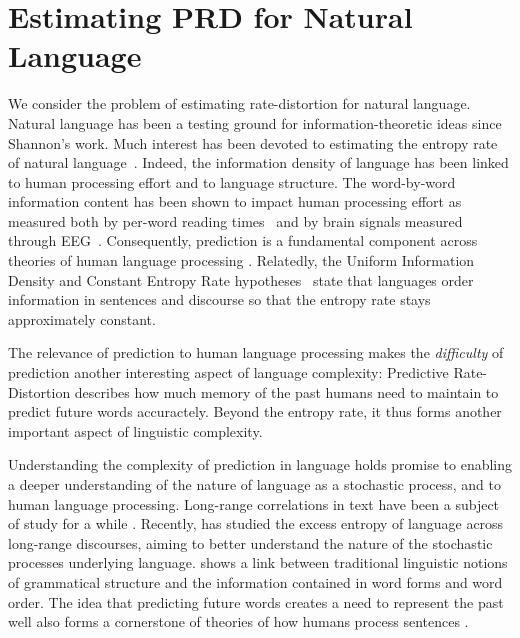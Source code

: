 \documentclass[entropy,article,submit,moreauthors,pdftex,10pt,a4paper]{Definitions/mdpi}
\begin{document}
\section{Estimating PRD for Natural Language}\label{sec:language}

We consider the problem of estimating rate-distortion for natural language.
Natural language has been a testing ground for information-theoretic ideas since Shannon's work.
Much interest has been devoted to estimating the entropy rate of natural language~\citep{shannon1951prediction,takahira2016entropy,bentz2017entropy,takahashi2018cross}.
Indeed, the information density of language has been linked to human processing effort and to language structure.
The word-by-word information content has been shown to impact human processing effort as measured both by per-word reading times~\citep{hale-probabilistic-2001,levy-expectation-based-2008,smith-effect-2013} and by brain signals measured through EEG~\citep{DBLP:conf/acl/FrankOGV13, kuperberg2016we}.
Consequently, prediction is a fundamental component across theories of human language processing  \citep{kuperberg2016we}.
Relatedly, the Uniform Information Density and Constant Entropy Rate hypotheses~\citep{fenk1980konstanz, genzel2002entropy, jaeger2007speakers} state that languages order information in sentences and discourse so that the entropy rate stays approximately constant. %

The relevance of prediction to human language processing makes the \emph{difficulty} of prediction another interesting aspect of language complexity:
Predictive Rate-Distortion describes how much memory of the past humans need to maintain to predict future words accuractely.
Beyond the entropy rate, it thus forms another important aspect of linguistic complexity.


Understanding the complexity of prediction in language holds promise to enabling a deeper understanding of the nature of language as a stochastic process, and to human language processing.
Long-range correlations in text have been a subject of study for a while \citep{schenkel1993long,ebeling1994entropy,ebeling1995long,altmann2012origin,yang2016long,chen2018quantifying}.
Recently, \citet{dkebowski2018natural} has studied the excess entropy of language across long-range discourses, aiming to better understand the nature of the stochastic processes underlying language.
\citet{koplenig2017statistical} shows a link between traditional linguistic notions of grammatical structure and the information contained in word forms and word order.
The idea that predicting future words creates a need to represent the past well also forms a cornerstone of theories of how humans process sentences \citep{gibson-linguistic-1998,futrell-noisy-context-2017}.
\end{document}
